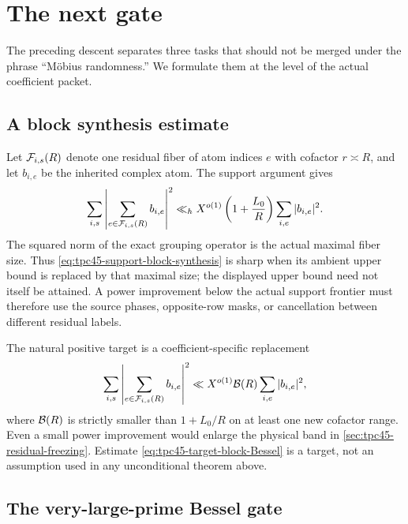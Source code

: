 \section{The next gate}
\label{sec:tpc45-next-gate}

The preceding descent separates three tasks that should not be merged
under the phrase ``M\"obius randomness.''  We formulate them at the
level of the actual coefficient packet.

\subsection{A block synthesis estimate}

Let \(\mathcal F_{i,s}(R)\) denote one residual fiber of atom indices \(e\)
with cofactor \(r\asymp R\), and let \(b_{i,e}\) be the inherited
complex atom.  The
support argument gives
\begin{equation}
 \sum_{i,s}
 \left|\sum_{e\in\mathcal F_{i,s}(R)}b_{i,e}\right|^2
 \ll_h X^{o(1)}\left(1+\frac{L_0}{R}\right)
 \sum_{i,e}|b_{i,e}|^2.
 \label{eq:tpc45-support-block-synthesis}
\end{equation}
The squared norm of the exact grouping operator is the actual maximal
fiber size.  Thus \eqref{eq:tpc45-support-block-synthesis} is sharp when
its ambient upper bound is replaced by that maximal size; the displayed
upper bound need not itself be attained.  A power improvement below the
actual support frontier must therefore use the source phases,
opposite-row masks, or cancellation between different residual labels.

The natural positive target is a coefficient-specific replacement
\begin{equation}
 \sum_{i,s}
 \left|\sum_{e\in\mathcal F_{i,s}(R)}b_{i,e}\right|^2
 \ll X^{o(1)}\mathcal B(R)
 \sum_{i,e}|b_{i,e}|^2,
 \label{eq:tpc45-target-block-Bessel}
\end{equation}
where \(\mathcal B(R)\) is strictly smaller than \(1+L_0/R\) on at least one
new cofactor range.  Even a small power improvement would enlarge the
physical band in \cref{sec:tpc45-residual-freezing}.  Estimate
\eqref{eq:tpc45-target-block-Bessel} is a target, not an assumption used
in any unconditional theorem above.

\subsection{The very-large-prime Bessel gate}

